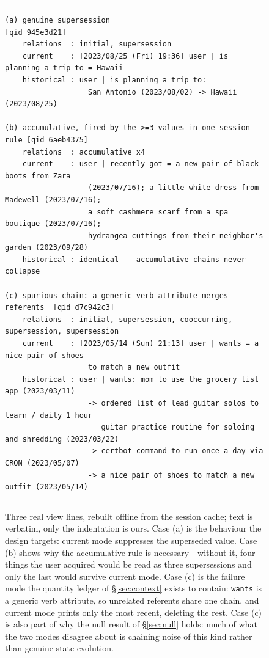 \documentclass[11pt]{article}
\begin{document}
\begin{figure}[ht]
\centering
\begin{minipage}{0.97\textwidth}
\hrule\vspace{0.6em}
\footnotesize
\begin{verbatim}
(a) genuine supersession                                      [qid 945e3d21]
    relations  : initial, supersession
    current    : [2023/08/25 (Fri) 19:36] user | is planning a trip to = Hawaii
    historical : user | is planning a trip to:
                   San Antonio (2023/08/02) -> Hawaii (2023/08/25)

(b) accumulative, fired by the >=3-values-in-one-session rule [qid 6aeb4375]
    relations  : accumulative x4
    current    : user | recently got = a new pair of black boots from Zara
                   (2023/07/16); a little white dress from Madewell (2023/07/16);
                   a soft cashmere scarf from a spa boutique (2023/07/16);
                   hydrangea cuttings from their neighbor's garden (2023/09/28)
    historical : identical -- accumulative chains never collapse

(c) spurious chain: a generic verb attribute merges referents  [qid d7c942c3]
    relations  : initial, supersession, cooccurring, supersession, supersession
    current    : [2023/05/14 (Sun) 21:13] user | wants = a nice pair of shoes
                   to match a new outfit
    historical : user | wants: mom to use the grocery list app (2023/03/11)
                   -> ordered list of lead guitar solos to learn / daily 1 hour
                      guitar practice routine for soloing and shredding (2023/03/22)
                   -> certbot command to run once a day via CRON (2023/05/07)
                   -> a nice pair of shoes to match a new outfit (2023/05/14)
\end{verbatim}
\vspace{-0.4em}\hrule
\end{minipage}
\caption{Three real view lines, rebuilt offline from the session cache; text is verbatim, only the indentation is ours. Case (a) is the behaviour the design targets: current mode suppresses the superseded value. Case (b) shows why the accumulative rule is necessary---without it, four things the user acquired would be read as three supersessions and only the last would survive current mode. Case (c) is the failure mode the quantity ledger of \S\ref{sec:context} exists to contain: \texttt{wants} is a generic verb attribute, so unrelated referents share one chain, and current mode prints only the most recent, deleting the rest. Case (c) is also part of why the null result of \S\ref{sec:null} holds: much of what the two modes disagree about is chaining noise of this kind rather than genuine state evolution.}
\label{fig:view}
\end{figure}
\end{document}
